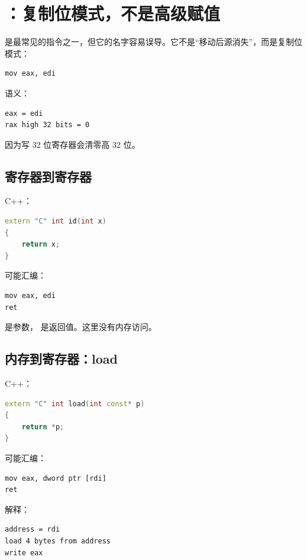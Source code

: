 \section{：复制位模式，不是高级赋值}

 是最常见的指令之一，但它的名字容易误导。它不是“移动后源消失”，而是复制位模式：

\begin{lstlisting}
mov eax, edi
\end{lstlisting}

语义：

\begin{lstlisting}
eax = edi
rax high 32 bits = 0
\end{lstlisting}

因为写 32 位寄存器会清零高 32 位。

\subsection{寄存器到寄存器}

C++：

\begin{lstlisting}[language=C++]
extern "C" int id(int x)
{
    return x;
}
\end{lstlisting}

可能汇编：

\begin{lstlisting}
mov eax, edi
ret
\end{lstlisting}

 是参数， 是返回值。这里没有内存访问。

\subsection{内存到寄存器：load}

C++：

\begin{lstlisting}[language=C++]
extern "C" int load(int const* p)
{
    return *p;
}
\end{lstlisting}

可能汇编：

\begin{lstlisting}
mov eax, dword ptr [rdi]
ret
\end{lstlisting}

解释：

\begin{lstlisting}
address = rdi
load 4 bytes from address
write eax
\end{lstlisting}

